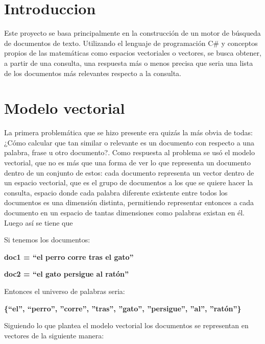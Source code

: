 \documentclass[10pt]{article}
\begin{document}
\begingroup %

\section{Introduccion}

Este proyecto se basa principalmente en la construcción de un motor de búsqueda de documentos de texto. Utilizando el lenguaje de programación C\# y conceptos propios de las matemáticas como espacios vectoriales o vectores, se busca obtener, a partir de una consulta, una respuesta más o menos precisa que seria una lista de los documentos más relevantes respecto a la consulta.

\section{Modelo vectorial}
\label{sec:model}

La primera problemática que se hizo presente era quizás la más obvia de todas: ¿Cómo calcular que tan similar o relevante es un documento con respecto a una palabra, frase u otro documento?. Como respuesta al problema se usó el modelo vectorial, que no es más que una forma de ver lo que representa un documento dentro de un conjunto de estos: cada documento representa un vector dentro de un espacio vectorial, que es el grupo de documentos a los que se quiere hacer la consulta, espacio donde cada palabra diferente existente entre todos los documentos es una dimensión distinta, permitiendo representar entonces a cada documento en un espacio de tantas dimensiones como palabras existan en él. Luego así se tiene que

\vspace*{.2cm}

Si tenemos los documentos:

\begin{center}	
	\colorbox[RGB]{200,200,200}{
		\parbox[c][1.25cm]{10cm}{
			\begin{center}
				\textcolor[RGB]{50,50,50}{\bfseries doc1 = “el perro corre tras el gato” }
	
				\textcolor[RGB]{50,50,50}{\bfseries doc2 = “el gato persigue al ratón” }
			\end{center}
		}
	}
\end{center}
Entonces el universo de palabras seria:

\begin{center}	
	\colorbox[RGB]{200,200,200}{
		\parbox[c][1.25cm]{11cm}{
			\begin{center}
				\textcolor[RGB]{50,50,50}{\bfseries \{“el”, “perro”, ”corre”, ”tras”, ”gato”, ”persigue”, ”al”, ”ratón”\} }
			\end{center}
		}
	}
\end{center}
Siguiendo lo que plantea el modelo vectorial los documentos se representan en
vectores de la siguiente manera:
\end{document}
